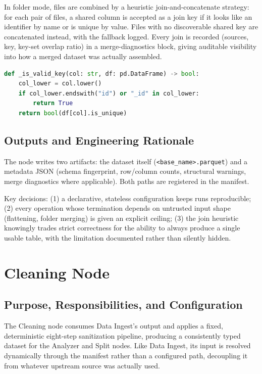 In folder mode, files are combined by a heuristic join-and-concatenate strategy: for each pair of files, a shared column is accepted as a join key if it looks like an identifier by name or is unique by value. Files with no discoverable shared key are concatenated instead, with the fallback logged. Every join is recorded (sources, key, key-set overlap ratio) in a merge-diagnostics block, giving auditable visibility into how a merged dataset was actually assembled.

\begin{lstlisting}[language=Python, caption={Join-key eligibility heuristic evaluated independently on each candidate column.}, label={lst:ingest-key-heuristic}]
def _is_valid_key(col: str, df: pd.DataFrame) -> bool:
    col_lower = col.lower()
    if col_lower.endswith("id") or "_id" in col_lower:
        return True
    return bool(df[col].is_unique)
\end{lstlisting}

\subsection{Outputs and Engineering Rationale}
\label{subsec:data-ingest-outputs}

The node writes two artifacts: the dataset itself (\texttt{<base\_name>.parquet}) and a metadata JSON (schema fingerprint, row/column counts, structural warnings, merge diagnostics where applicable). Both paths are registered in the manifest.

Key decisions: (1) a declarative, stateless configuration keeps runs reproducible; (2) every operation whose termination depends on untrusted input shape (flattening, folder merging) is given an explicit ceiling; (3) the join heuristic knowingly trades strict correctness for the ability to always produce a single usable table, with the limitation documented rather than silently hidden.

\section{Cleaning Node}
\label{sec:impl-cleaning}

\subsection{Purpose, Responsibilities, and Configuration}
\label{subsec:cleaning-overview}

The Cleaning node consumes Data Ingest's output and applies a fixed, deterministic eight-step sanitization pipeline, producing a consistently typed dataset for the Analyzer and Split nodes. Like Data Ingest, its input is resolved dynamically through the manifest rather than a configured path, decoupling it from whatever upstream source was actually used.

